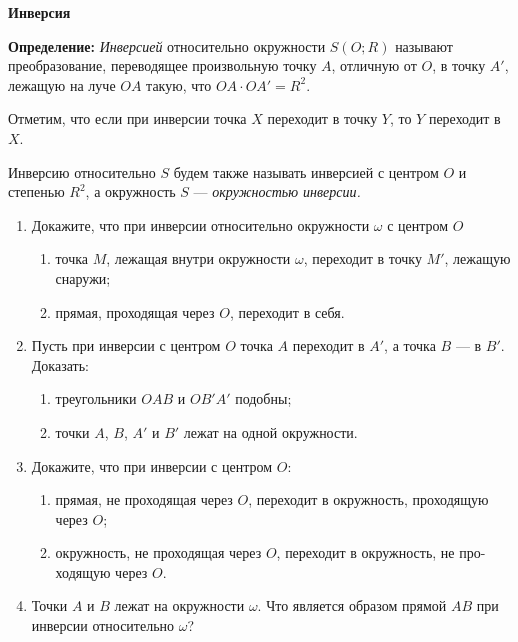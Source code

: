 \documentclass{article}
\begin{document}
\large

\begin{center}
	\textbf{Инверсия}
\end{center}

\textbf{Определение:} \textit{Инверсией} относительно окружности $S(O; R)$ называют преобразование, переводящее произвольную точку $A$, отличную от $O$, в точку $A'$, лежащую на луче $OA$ такую, что $OA \cdot OA' = R^2$.

Отметим, что если при инверсии точка $X$ переходит в точку $Y$, то $Y$ переходит в $X$.

Инверсию относительно $S$ будем также называть инверсией с центром $O$ и степенью $R^2$, а окружность $S$ — \textit{окружностью инверсии.}

\begin{enumerate}[label*=\protect\fbox{\arabic{enumi}}]

\item Докажите, что при инверсии относительно окружности $\omega$ с центром $O$
\begin{enumerate}[label=\alph*)]
\item точка $M$, лежащая внутри окружности $\omega$, переходит в точку $M'$, лежащую снаружи;
\item прямая, проходящая через $O$, переходит в себя.
\end{enumerate}

\item Пусть при инверсии с центром $O$ точка $A$ переходит в $A'$, а точка $B$ — в $B'$. Доказать:
\begin{enumerate}[label=\alph*)]
\item треугольники $OAB$ и $OB'A'$ подобны;
\item точки $A$, $B$, $A'$ и $B'$ лежат на одной окружности.
\end{enumerate}

\item Докажите, что при инверсии с центром $O$:
\begin{enumerate}[label=\alph*)]
\item прямая, не проходящая через $O$, переходит в окружность, проходящую через $O$;
\item окружность, не проходящая через $O$, переходит в окружность, не про- ходящую через $O$.
\end{enumerate}

\item Точки $A$ и $B$ лежат на окружности $\omega$. Что является образом прямой $AB$ при инверсии относительно $\omega$?


\end{enumerate}
\end{document}
